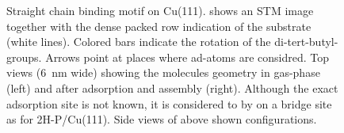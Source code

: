 \begin{figure}[h]
\begin{minipage}{0.45\textwidth}
{				\label{trans-nitro-on-cu111-70-shifted-chain-top-views}
			}
		\end{minipage}
		\caption{Straight chain binding motif on Cu(111).  shows an STM image together with the dense packed row indication of the substrate (white lines). Colored bars indicate the rotation of the di-tert-butyl-groups. Arrows point at places where ad-atoms are considred.
			 Top views (\SI{6}{\nano \meter} wide) showing the molecules geometry in gas-phase (left) and after adsorption and assembly (right). Although the exact adsorption site is not known, it is considered to by on a bridge site as for 2H-P/Cu(111).
			 Side views of above shown configurations.
		}
		\label{fig:two-leg-trans-cu111-motifs-1}
	\end{figure}
	
